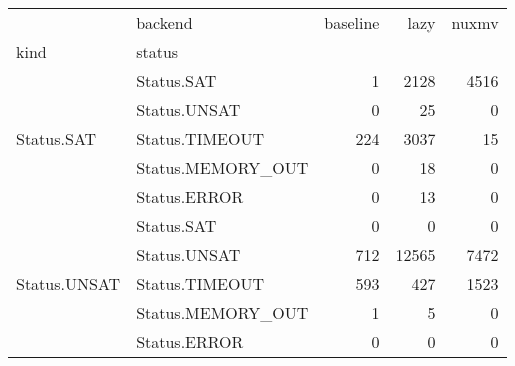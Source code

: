 \begin{tabular}{llrrr}
\toprule
 & backend & baseline & lazy & nuxmv \\
kind & status &  &  &  \\
\midrule
\multirow[c]{5}{*}{Status.SAT} & Status.SAT & 1 & 2128 & 4516 \\
 & Status.UNSAT & 0 & 25 & 0 \\
 & Status.TIMEOUT & 224 & 3037 & 15 \\
 & Status.MEMORY_OUT & 0 & 18 & 0 \\
 & Status.ERROR & 0 & 13 & 0 \\
\multirow[c]{5}{*}{Status.UNSAT} & Status.SAT & 0 & 0 & 0 \\
 & Status.UNSAT & 712 & 12565 & 7472 \\
 & Status.TIMEOUT & 593 & 427 & 1523 \\
 & Status.MEMORY_OUT & 1 & 5 & 0 \\
 & Status.ERROR & 0 & 0 & 0 \\
\bottomrule
\end{tabular}
